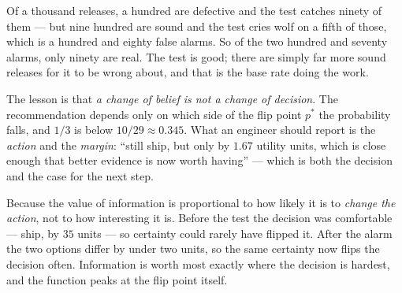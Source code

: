 \begin{ans}
  \item Of a thousand releases, a hundred are defective and the test catches ninety
        of them --- but nine hundred are sound and the test cries wolf on a fifth of
        those, which is a hundred and eighty false alarms. So of the two hundred and
        seventy alarms, only ninety are real. The test is good; there are simply far
        more sound releases for it to be wrong about, and that is the base rate
        doing the work.
  \item The lesson is that \emph{a change of belief is not a change of decision}.
        The recommendation depends only on which side of the flip point $p^{*}$ the
        probability falls, and $1/3$ is below $10/29 \approx 0.345$. What an
        engineer should report is the \emph{action} and the \emph{margin}: ``still
        ship, but only by $1.67$ utility units, which is close enough that better
        evidence is now worth having'' --- which is both the decision and the case
        for the next step.
  \item Because the value of information is proportional to how likely it is to
        \emph{change the action}, not to how interesting it is. Before the test the
        decision was comfortable --- ship, by $35$ units --- so certainty could
        rarely have flipped it. After the alarm the two options differ by under two
        units, so the same certainty now flips the decision often. Information is
        worth most exactly where the decision is hardest, and the function peaks at
        the flip point itself.
\end{ans}

